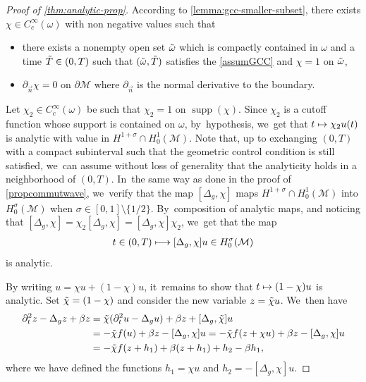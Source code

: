 \documentclass[10pt]{amsart}
\newcommand\mto{\mathchoice{\longmapsto}{\mapsto}{\mapsto}{\mapsto}}
\DeclareMathOperator{\supp}{\mathrm{supp}}
\theoremstyle{definition}
\let\mc\mathcal
\newcommand{\M}{\mc{M}}
\begin{document}
\begin{proof}[Proof of \cref{thm:analytic-prop}] According to \cref{lemma:gcc-smaller-subset}, there exists $\chi\in C^{\infty}_c(\omega)$ with non negative values such that
\begin{itemize}
\item there exists a nonempty open set $\Tilde{\omega}$ which is compactly contained in $\omega$ and a time $\Tilde T\in(0,T)$ such that $(\Tilde{\omega}, \Tilde{T})$ satisfies the \ref{assumGCC} and $\chi =1$ on $\Tilde{\omega}$,
\item $\partial_{\vec n} \chi=0$ on $\partial \M$ where $\partial_{\vec n}$ is the normal derivative to the boundary.
\end{itemize}

Let $\chi_2 \in C^{\infty}_c(\omega)$ be such that $\chi_2 =1$ on $\supp(\chi)$. Since $\chi_2$ is a cutoff function whose support is contained on $\omega$, by~hypothesis, we~get that $t\mto \chi_2u(t)$ is analytic with value in $ H^{1+\sigma}\cap H_0^1(\M)$. Note that, up to exchanging $(0,T)$ with a compact subinterval such that the geometric control condition is still satisfied, we~can assume without loss of generality that the analyticity holds in a neighborhood of $(0,T)$. In~the same way as done in the proof of \cref{propcommutwave}, we~verify that the map $[\Delta_g, \chi]$ maps $ H^{1+\sigma}\cap H_0^1(\M)$ into $H^{\sigma}_0(\M)$ when $\sigma\in [0, 1]\setminus \{1/2\}$. By~composition of analytic maps, and noticing that $[\Delta_g, \chi]=\chi_2[\Delta_g, \chi]=[\Delta_g, \chi]\chi_2$, we~get that the map\vspace*{-3pt}
\begin{align*}
t\in (0, T)\mto [\Delta_g, \chi] u\in H_0^{\sigma}(\M)
\end{align*}
is analytic.

By writing $u=\chi u+(1-\chi)u$, it~remains to show that $t\mto (1-\chi)u$ is analytic. Set $\Tilde{\chi}=(1-\chi)$ and consider the new variable $z=\Tilde{\chi} u$. We~then have\vspace*{-3pt}
\begin{align*}
\partial_t^2 z-\Delta_g z+\beta z&=\Tilde{\chi}(\partial_t^2 u-\Delta_g u)+\beta z+[\Delta_g, \Tilde{\chi}]u\\
&=-\Tilde{\chi} f(u)+\beta z-[\Delta_g, \chi]u=-\Tilde{\chi} f(z+\chi u)+\beta z-[\Delta_g, \chi]u\\
&=-\Tilde{\chi} f(z+h_1)+\beta (z+h_1)+h_2-\beta h_1,
\end{align*}
where we have defined the functions $h_1=\chi u$ and $h_2=-[\Delta_g, \chi]u$.


\end{proof}
\end{document}
